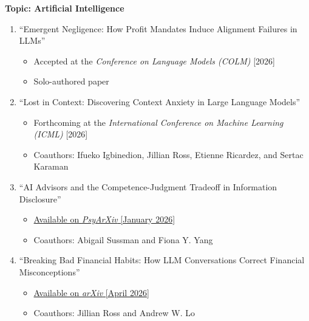 \documentclass[11pt]{article}
\begin{document}
{\bf Topic: Artificial Intelligence} \\
\vspace*{-.2in}
\begin{enumerate}

\item ``Emergent Negligence: How Profit Mandates Induce Alignment Failures in LLMs''
\begin{itemize}
\vspace*{-.07in}
	\item Accepted at the {\it Conference on Language Models (COLM)} [2026]
\vspace*{-.07in}
	\item Solo-authored paper
\end{itemize}
\vskip 0.24cm

\item ``Lost in Context: Discovering Context Anxiety in Large Language Models''
\begin{itemize}
\vspace*{-.07in}
	\item Forthcoming at the {\it International Conference on Machine Learning (ICML)} [2026]
\vspace*{-.07in}
	\item Coauthors: Ifueko Igbinedion, Jillian Ross, Etienne Ricardez, and Sertac Karaman
\end{itemize}
\vskip 0.24cm

\item ``AI Advisors and the Competence-Judgment Tradeoff in Information Disclosure''
\begin{itemize}
\vspace*{-.07in}
	\item \href{https://osf.io/preprints/psyarxiv/sejdg_v1}{Available on {\it PsyArXiv} [January 2026]}
\vspace*{-.07in}
	\item Coauthors: Abigail Sussman and Fiona Y. Yang
\end{itemize}
\vskip 0.24cm

\item ``Breaking Bad Financial Habits: How LLM Conversations Correct Financial Misconceptions''
\begin{itemize}
\vspace*{-.07in}
	\item \href{https://arxiv.org/abs/2604.27022}{Available on {\it arXiv} [April 2026]}
\vspace*{-.07in}
	\item Coauthors: Jillian Ross and Andrew W. Lo
\end{itemize}
\vskip 0.24cm


\end{enumerate}
\end{document}
